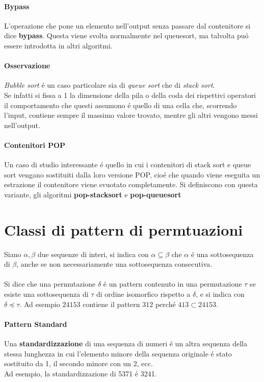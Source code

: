 \paragraph*{Bypass} L'operazione che pone un elemento nell'output senza passare dal contenitore si dice \textbf{bypass}. Questa viene svolta normalmente nel queuesort, ma talvolta pu\'o essere introdotta in altri algoritmi.
\paragraph*{Osservazione}\textit{Bubble sort} \'e un caso particolare sia di \textit{queue sort} che di \textit{stack sort}.\\
Se infatti si fissa a 1 la dimensione della pila o della coda dei rispettivi operatori il comportamento che questi assumono \'e quello di una cella che, scorrendo l'input, contiene sempre il massimo valore trovato, mentre gli altri vengono messi nell'output.
\paragraph*{Contenitori POP}Un caso di studio interessante \'e quello in cui i contenitori di stack sort e queue sort vengano sostituiti dalla loro versione POP, cio\'e che quando viene eseguita un estrazione il contenitore viene svuotato completamente. Si definiscono con questa variante, gli algoritmi \textbf{pop-stacksort} e \textbf{pop-queuesort} 
\section*{Classi di pattern di permtuazioni}
\cite{bouvel2022preimages}
Siano $\alpha,\beta$ due sequenze di interi, si indica con $\alpha \subseteq \beta$ che $\alpha$ \'e una sottosequenza di $\beta$, anche se non necessariamente una sottosequenza consecutiva.\\\\
Si dice che una permutazione $\delta$ \'e un pattern contenuto in una permutazione $\tau$ se esiste una sottosequenza di $\tau$ di ordine isomorfico rispetto a $\delta$, e si indica con $\delta\preceq\tau$. Ad esempio $24153$ contiene il pattern $312$ perch\'e $413\subset{24153}$.
\paragraph*{Pattern Standard}
Una \textbf{standardizzazione}\cite{claesson2012sorting} di una sequenza di numeri \'e un altra sequenza della stessa lunghezza in cui l'elemento minore della sequenza originale \'e stato sostituito da 1, il secondo minore con un 2, ecc.\\
Ad esempio, la standardizzazione di 5371 \'e 3241.
